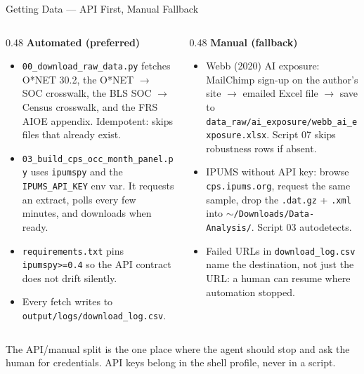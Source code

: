 \documentclass[10pt,english,aspectratio=169]{beamer}
\begin{document}
\begin{frame}{Getting Data --- API First, Manual Fallback}
\begin{columns}[T]
\begin{column}{0.48\textwidth}
\textbf{Automated (preferred)}
\begin{itemize}\scriptsize
  \item \texttt{00\_download\_raw\_data.py} fetches O*NET 30.2, the O*NET $\to$ SOC crosswalk, the BLS SOC $\to$ Census crosswalk, and the FRS AIOE appendix. Idempotent: skips files that already exist.
  \item \texttt{03\_build\_cps\_occ\_month\_panel.py} uses \texttt{ipumspy} and the \texttt{IPUMS\_API\_KEY} env var. It requests an extract, polls every few minutes, and downloads when ready.
  \item \texttt{requirements.txt} pins \texttt{ipumspy>=0.4} so the API contract does not drift silently.
  \item Every fetch writes to \texttt{output/logs/download\_log.csv}.
\end{itemize}
\end{column}
\begin{column}{0.48\textwidth}
\textbf{Manual (fallback)}
\begin{itemize}\scriptsize
  \item Webb (2020) AI exposure: MailChimp sign-up on the author's site $\to$ emailed Excel file $\to$ save to \texttt{data\_raw/ai\_exposure/webb\_ai\_exposure.xlsx}. Script 07 skips robustness rows if absent.
  \item IPUMS without API key: browse \texttt{cps.ipums.org}, request the same sample, drop the \texttt{.dat.gz} + \texttt{.xml} into \texttt{$\sim$/Downloads/Data-Analysis/}. Script 03 autodetects.
  \item Failed URLs in \texttt{download\_log.csv} name the destination, not just the URL: a human can resume where automation stopped.
\end{itemize}
\end{column}
\end{columns}

\vspace{0.2cm}
\begin{tcolorbox}[colback=blue!3,colframe=RedTitle!60]\scriptsize
The API/manual split is the one place where the agent should stop and ask the human for credentials. API keys belong in the shell profile, never in a script.
\end{tcolorbox}
\end{frame}
\end{document}
